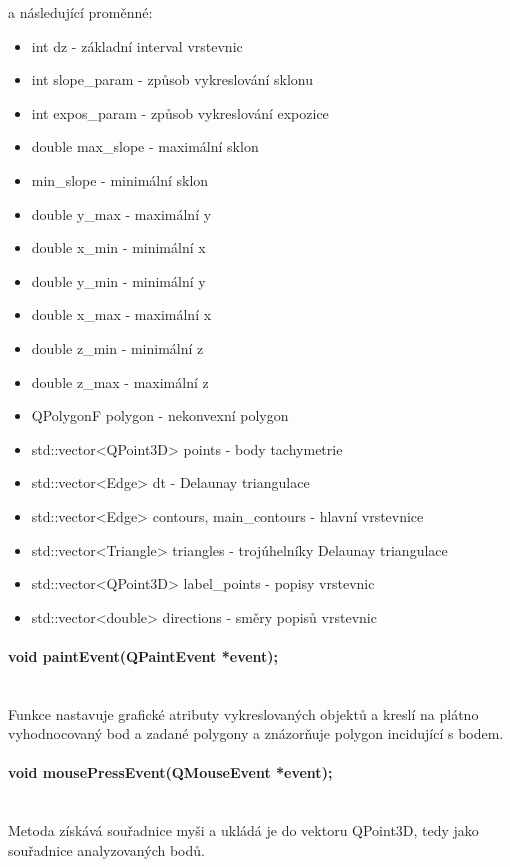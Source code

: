 \documentclass[11pt]{article}
\begin{document}
a následující proměnné:

\begin{itemize}
\item int dz - základní interval vrstevnic
\item int slope\_param - způsob vykreslování sklonu 
\item int expos\_param - způsob vykreslování expozice         
\item double max\_slope - maximální sklon
\item min\_slope - minimální sklon
\item double y\_max - maximální y
\item double x\_min - minimální x
\item double y\_min - minimální y
\item double x\_max - maximální x
\item double z\_min - minimální z
\item double z\_max - maximální z
\item QPolygonF polygon - nekonvexní polygon            
\item std::vector<QPoint3D> points - body tachymetrie 
\item std::vector<Edge> dt - Delaunay triangulace
\item std::vector<Edge> contours, main\_contours - hlavní vrstevnice
\item std::vector<Triangle> triangles - trojúhelníky Delaunay triangulace    
\item std::vector<QPoint3D> label\_points - popisy vrstevnic
\item std::vector<double> directions - směry popisů vrstevnic 
\end{itemize}

\paragraph{void paintEvent(QPaintEvent *event);}\mbox{}\\
Funkce nastavuje grafické atributy vykreslovaných objektů a kreslí na plátno vyhodnocovaný bod a zadané polygony a znázorňuje polygon incidující s bodem. 

\paragraph{void mousePressEvent(QMouseEvent *event);}\mbox{}\\
Metoda získává souřadnice myši a ukládá je do vektoru QPoint3D, tedy jako souřadnice analyzovaných bodů.
\end{document}
